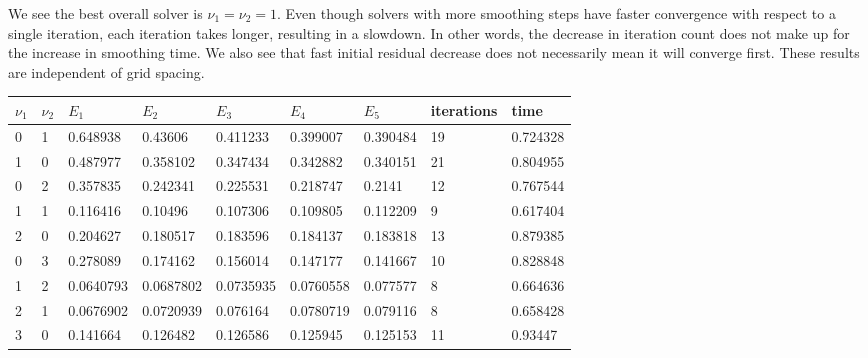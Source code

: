 \documentclass{article} %
\theoremstyle{plain}
\numberwithin{equation}{section} %
\numberwithin{figure}{section} %
\numberwithin{table}{section} %
\begin{document}
We see the best overall solver is $\nu_1 = \nu_2 = 1$.  Even though solvers with more smoothing steps have faster convergence with respect to a single iteration, each iteration takes longer, resulting in a slowdown.  In other words, the decrease in iteration count does not make up for the increase in smoothing time.  We also see that fast initial residual decrease does not necessarily mean it will converge first.  These results are independent of grid spacing.
\FloatBarrier
\begin{table}[ht!]
\centering
\begin{tabular}{||l|l|||l|l|l|l|l||l||l||}
\hline\hline
   $\nu_1$ &   $\nu_2$ &       $E_1$ &       $E_2$ &       $E_3$ &       $E_4$ &      $E_5$ &   iterations &     time \\
\hline\hline
      0 &      1 & 0.648938  & 0.43606   & 0.411233  & 0.399007  & 0.390484  &    {\color{red}19} & {\color{red}0.724328} \\\hline
      1 &      0 & {\color{red}0.487977}  & {\color{red}0.358102}  & {\color{red}0.347434}  & {\color{red}0.342882}  & {\color{red}0.340151}  &    21 & 0.804955 \\\hline\hline\hline

      0 &      2 & 0.357835  & 0.242341  & 0.225531  & 0.218747  & 0.2141    &    12 & 0.767544 \\\hline
      1 &      1 & {\color{red}0.116416}  & {\color{red}0.10496}   & {\color{red}0.107306}  & {\color{red}0.109805}  & {\color{red}0.112209}  &     {\color{red}9} & {\color{red}0.617404} \\\hline
      2 &      0 & 0.204627  & 0.180517  & 0.183596  & 0.184137  & 0.183818  &    13 & 0.879385 \\\hline\hline\hline

      0 &      3 & 0.278089  & 0.174162  & 0.156014  & 0.147177  & 0.141667  &    10 & 0.828848 \\\hline
      1 &      2 & {\color{red}0.0640793} & {\color{red}0.0687802} & {\color{red}0.0735935} & {\color{red}0.0760558} & {\color{red}0.077577}  &     {\color{red}8} & 0.664636 \\\hline
      2 &      1 & 0.0676902 & 0.0720939 & 0.076164  & 0.0780719 & 0.079116  &     {\color{red}8} & {\color{red}0.658428} \\\hline
      3 &      0 & 0.141664  & 0.126482  & 0.126586  & 0.125945  & 0.125153  &    11 & 0.93447  \\\hline\hline\hline


\end{tabular}
\end{table}
\end{document}
